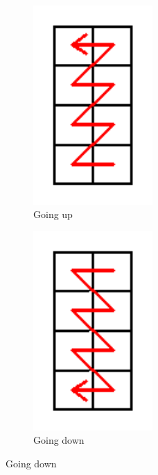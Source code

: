 \begin{figure}[H]
  \centering
  \begin{subfigure}{0.3\textwidth}
    \centering
    \includegraphics[width=0.5\textwidth]{images/qr_plcmt_byte_up}
    \caption{Going up}
    \label{fig:qr_plcmt_byte_up}
  \end{subfigure}
  \begin{subfigure}{0.3\textwidth}
    \centering
    \includegraphics[width=0.5\textwidth]{images/qr_plcmt_byte_down}
    \caption{Going down}
    \label{fig:qr_plcmt_byte_down}

\end{subfigure}
\end{figure}
